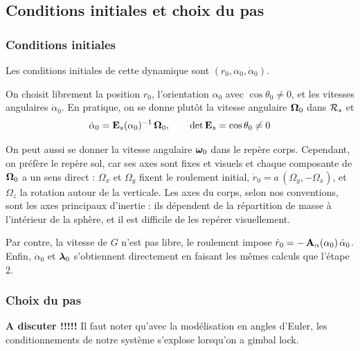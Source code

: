 \subsection{Conditions initiales et choix du pas}

\subsubsection{Conditions initiales}
\begin{proposition}
    Les conditions initiales de cette dynamique sont $(r_0, \alpha_0, \dot{\alpha}_0)$.
\end{proposition}

On choisit librement la position $r_0$, l'orientation $\alpha_0$ avec
$\cos\theta_0 \neq 0$, et les vitesses angulaires $\dot\alpha_0$. En
pratique, on se donne plutôt la vitesse angulaire $\bm{\Omega}_0$ dans
$\mathcal{R}_{s}$ et
\[
    \dot\alpha_0 = \mathbf{E}_s(\alpha_0)^{-1}\,\bm{\Omega}_0,
    \qquad
    \det\mathbf{E}_s = \cos\theta_0 \neq 0
\]
\begin{remarque}
    On peut aussi se donner la vitesse angulaire $\bm{\omega}_0$
    dans le repère corps. Cependant, on préfère le repère sol, car ses axes sont fixes et visuels et chaque composante de $\bm{\Omega}_0$ a un sens direct :
    $\Omega_x$ et $\Omega_y$ fixent le roulement initial,
    $\dot r_0 = a\,(\Omega_y, -\Omega_x)$, et $\Omega_z$ la rotation
    autour de la verticale. Les axes du corps, selon nos conventions, sont les axes principaux d'inertie :
    ils dépendent de la répartition de masse à l'intérieur de la
    sphère, et il est difficile de les repérer visuellement.
\end{remarque}

Par contre, la vitesse de $G$ n'est pas libre, le roulement impose
$\dot r_0 = -\,\mathbf{A}_\alpha(\alpha_0)\,\dot\alpha_0$. Enfin,
$\ddot\alpha_0$ et $\bm{\lambda}_0$ s'obtiennent directement en faisant les mêmes calculs que l'étape 2.

\subsubsection{Choix du pas}

\textbf{A discuter !!!!!}
Il faut noter qu'avec la modélisation en angles d'Euler, les conditionnements de notre système s'explose lorsqu'on a gimbal lock.

